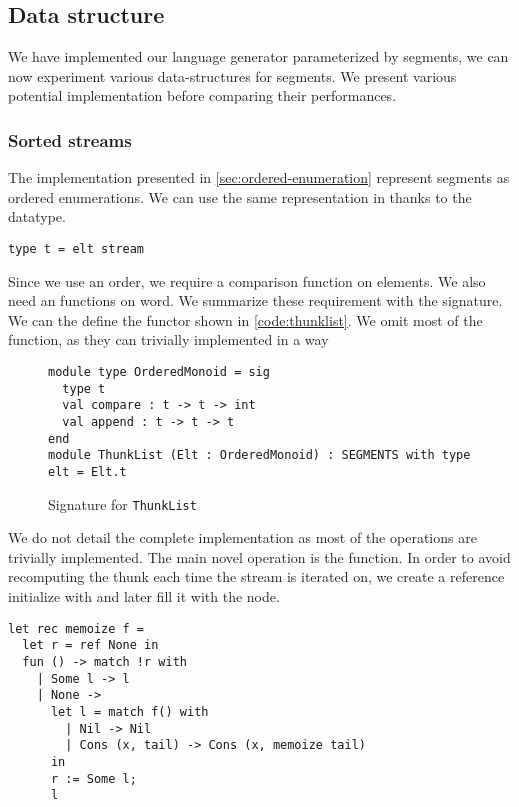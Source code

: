 \subsection{Data structure}

We have implemented our language generator parameterized by segments, we can now
experiment various data-structures for segments. We present various
potential implementation before comparing their performances.

\subsubsection{Sorted streams}

The \haskell implementation presented in \autoref{sec:ordered-enumeration}
represent segments as ordered enumerations. We can use
the same representation in \ocaml thanks to the  datatype.
\begin{lstlisting}[numbers=none]
type t = elt stream
\end{lstlisting}

Since we use an order, we require a comparison function on elements.
We also need an  functions on word. We summarize these requirement
with the  signature.
We can the define the  functor shown in \autoref{code:thunklist}.
We omit most of the function, as they can trivially implemented in a way

\begin{figure}
  \centering
\begin{lstlisting}
module type OrderedMonoid = sig
  type t
  val compare : t -> t -> int
  val append : t -> t -> t
end
module ThunkList (Elt : OrderedMonoid) : SEGMENTS with type elt = Elt.t
\end{lstlisting}
  \caption{Signature for \texttt{ThunkList}}
  \label{code:thunklist}
\end{figure}

We do not detail the complete implementation as most of the operations are trivially implemented. The main novel operation is the  function.
In order to avoid recomputing the thunk each time the stream is iterated on,
we create a reference initialize with  and later fill it with the
node.
\begin{lstlisting}
let rec memoize f =
  let r = ref None in
  fun () -> match !r with
    | Some l -> l
    | None ->
      let l = match f() with
        | Nil -> Nil
        | Cons (x, tail) -> Cons (x, memoize tail)
      in
      r := Some l;
      l
\end{lstlisting}

